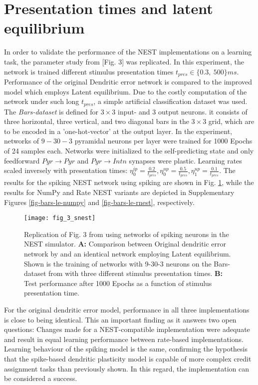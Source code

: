 \section{Presentation times and latent equilibrium}\label{sec-le-tpres}

In order to validate the performance of the NEST implementations on a learning task, the parameter study from
\citep{Haider2021}[Fig. 3] was replicated. In this experiment, the network is trained different stimulus presentation
times $t_{pres} \in \{0.3,\ 500\}ms$. Performance of the original Dendritic error network is compared to the improved
model which employs Latent equilibrium. Due to the costly computation of the network under such long $t_{pres}$, a
simple artificial classification dataset was used. The \textit{Bars-dataset} is defined for $3\times3$ input- and $3$
output neurons. it consists of three horizontal, three vertical, and two diagonal bars in the $3\times3$ grid, which are
to be encoded in a 'one-hot-vector' at the output layer. In the experiment, networks of $9-30-3$ pyramidal neurons per
layer were trained for 1000 Epochs of 24 samples each. Networks were initialized to the self-predicting state and only
feedforward $Pyr\rightarrow Pyr$ and $Pyr \rightarrow Intn$ synapses were plastic. Learning rates scaled inversely with
presentation times: $\eta^{ip}_0 = \frac{0.2}{t_{pres}}, \eta^{up}_0 = \frac{0.5}{t_{pres}}, \eta^{up}_1 =
    \frac{0.1}{t_{pres}}$. The results for the spiking NEST network using spiking are shown in Fig. \ref{fig-bars-le-snest},
while the results for NumPy and Rate NEST variants are depicted in Supplementary Figures \ref{fig-bars-le-numpy} and
\ref{fig-bars-le-rnest}, respectively.


\begin{figure}[h]
    \centering
    \texttt{[image: fig\_3\_snest]}
    \caption{Replication of Fig. 3 from \cite{Haider2021} using networks of spiking neurons in the NEST simulator.
        \textbf{A:} Comparison between Original dendritic error network by and an identical network employing Latent
        equilibrium. Shown is the training of networks with 9-30-3 neurons on the Bars-dataset from with three different
        stimulus presentation times. \textbf{B:} Test performance after 1000 Epochs as a function of stimulus
        presentation time.}
    \label{fig-bars-le-snest}
\end{figure}

For the original dendritic error model, performance in all three implementations is close to being identical. This an
important finding as it answers two open questions: Changes made for a NEST-compatible implementation were adequate and
result in equal learning performance between rate-based implementations. Learning behaviour of the spiking model is the
same, confirming the hypothesis that the spike-based dendritic plasticity model is capable of more complex credit
assignment tasks than previously shown. In this regard, the implementation can be considered a success.


